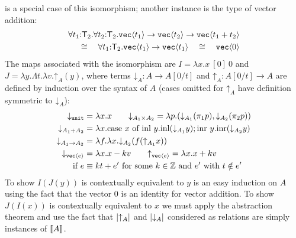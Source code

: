 is a special case of this isomorphism; another instance is the
type of vector addition:
\begin{eqnarray*}
\forall t_1\mathord:\mathsf{T}_2.\forall t_2\mathord:\mathsf{T}_2.\textup{\texttt{vec}}\langle t_1 \rangle\to\textup{\texttt{vec}}\langle t_2 \rangle\to\textup{\texttt{vec}}\langle t_1+t_2 \rangle\\
\cong\quad
\forall t_1\mathord:\mathsf{T}_2.\textup{\texttt{vec}}\langle t_1 \rangle\to\textup{\texttt{vec}}\langle t_1 \rangle\quad\cong\quad
\textup{\texttt{vec}}\langle 0 \rangle
\end{eqnarray*}
\noindent
\newcommand{\transup}[1]{\mathord\uparrow_{#1}}
\newcommand{\transdn}[1]{\mathord\downarrow_{#1}}
The maps associated with the isomorphism are 
$I = \lambda x. x\ [0]\ 0$ and $J = \lambda y. \Lambda t.\lambda v. \transup A (y)$,
where terms $\transdn A : A\to A[0/t]$ and $\transup A : A[0/t] \to A$ are defined by induction over the syntax of $A$ (cases omitted for $\transup A$ have definition symmetric to $\transdn A$):
\begin{align*}
\transdn{\tyPrimNm{unit}} &= \lambda x. x \qquad
\transdn{A_1\times A_2} = \lambda p. (\transdn{A_1}(\pi_1 p),\transdn{A_2}(\pi_2 p))\\ 
\transdn{A_1 + A_2} &= \lambda x.
\textrm{case}\ x\ \textrm{of}\ \textrm{inl}\ y.\textrm{inl}(\transdn{A_1}y); \textrm{inr}\ y.\textrm{inr}(\transdn{A_2}y)\\ 
\transdn{A_1\to A_2} &= \lambda f. \lambda x. \transdn{A_2} (f(\transup{A_1}x))\\ 
\transdn{\tyPrim{vec}{e}} &= \lambda x. x - kv \qquad
\transup{\tyPrim{vec}{e}} = \lambda x. x + kv\\ 
\text{ if }e & \equiv k t + e' \text{ for
  some }k\in\setOfIntegers \text{ and }e'\text{ with }t\notin e'
\end{align*}
To show $I(J(y))$ is contextually equivalent to $y$ is an easy
induction on $A$ using the fact that the vector $0$
is an identity for vector addition. To show $J(I(x))$ is contextually
equivalent to $x$ we must apply the abstraction theorem and use
the fact that $\tmSem{\transup A}$ and $\tmSem{\transdn A}$ 
considered as relations are simply instances of $\llbracket A \rrbracket^{\mathcal{}}_{\mathcal{}}$.

